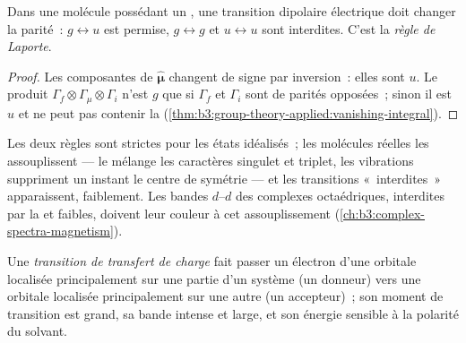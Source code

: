 \begin{theorem}\label{thm:b3:electronic-spectroscopy:laporte}
Dans une molécule possédant un , une transition
dipolaire électrique doit changer la parité~: $g \leftrightarrow u$ est
permise, $g \leftrightarrow g$ et $u
\leftrightarrow u$ sont interdites. C'est la \emph{règle de Laporte}.
\end{theorem}

\begin{proof}
Les composantes de $\hat{\boldsymbol\mu}$ changent de signe par
inversion~: elles sont $u$.
Le produit $\Gamma_f\otimes\Gamma_\mu\otimes\Gamma_i$ n'est $g$ que si
$\Gamma_f$ et $\Gamma_i$
sont de parités opposées~; sinon il est $u$ et ne peut pas contenir la
(\cref{thm:b3:group-theory-applied:vanishing-integral}).
\end{proof}

Les deux règles sont strictes pour les états idéalisés~; les molécules
réelles les assouplissent --- le  mélange les
caractères singulet et triplet, les vibrations suppriment un instant le
centre de symétrie --- et les transitions «~interdites~» apparaissent,
faiblement. Les bandes $d$--$d$ des complexes octaédriques, interdites
par la  et faibles, doivent leur couleur à cet
assouplissement
(\cref{ch:b3:complex-spectra-magnetism}).

\begin{definition}\label{def:b3:electronic-spectroscopy:charge-transfer}
Une \emph{transition de transfert de charge} fait passer
un électron d'une orbitale localisée principalement sur une partie d'un
système (un donneur) vers une orbitale localisée principalement sur une
autre (un accepteur)~; son moment de transition est grand, sa bande
intense et large, et son énergie sensible à la polarité du solvant.
\end{definition}

